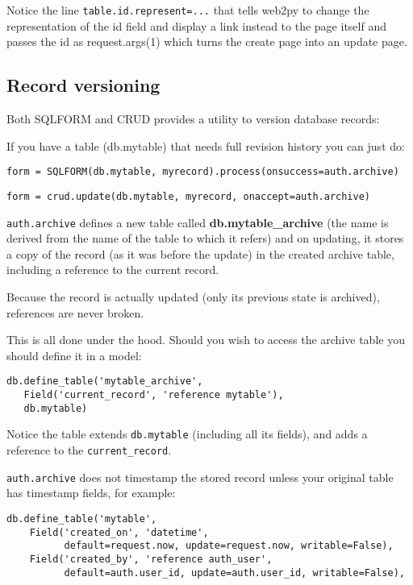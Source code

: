 \documentclass[justified,sixbynine,notoc]{tufte-book}
\def\ft{\small\tt}
\begin{document}
\begin{fullwidth}
Notice the line {\ft table.id.represent=...} that tells web2py to change the representation of the id field and display a link instead to the page itself and passes the id as request.args(1) which turns the create page into an update page.

\goodbreak\subsection{Record versioning}

Both SQLFORM and CRUD provides a utility to version database records:

If you have a table (db.mytable) that needs full revision history you can just do:
\begin{lstlisting}
form = SQLFORM(db.mytable, myrecord).process(onsuccess=auth.archive)
\end{lstlisting}

\begin{lstlisting}
form = crud.update(db.mytable, myrecord, onaccept=auth.archive)
\end{lstlisting}

{\ft auth.archive} defines a new table called {\bf db.mytable\_archive} (the name is derived from the name of the table to which it refers) and on updating, it stores a copy of the record (as it was before the update) in the created archive table, including a reference to the current record.

Because the record is actually updated (only its previous state is archived), references are never broken.

This is all done under the hood.  Should you wish to access the archive table you should define it in a model:
\begin{lstlisting}
db.define_table('mytable_archive',
   Field('current_record', 'reference mytable'),
   db.mytable)
\end{lstlisting}

Notice the table extends {\ft db.mytable} (including all its fields), and adds  a reference to the {\ft current\_record}.

{\ft auth.archive} does not timestamp the stored record unless your original table has timestamp fields, for example:

\begin{lstlisting}
db.define_table('mytable',
    Field('created_on', 'datetime',
          default=request.now, update=request.now, writable=False),
    Field('created_by', 'reference auth_user',
          default=auth.user_id, update=auth.user_id, writable=False),
\end{lstlisting}


\end{fullwidth}
\end{document}
